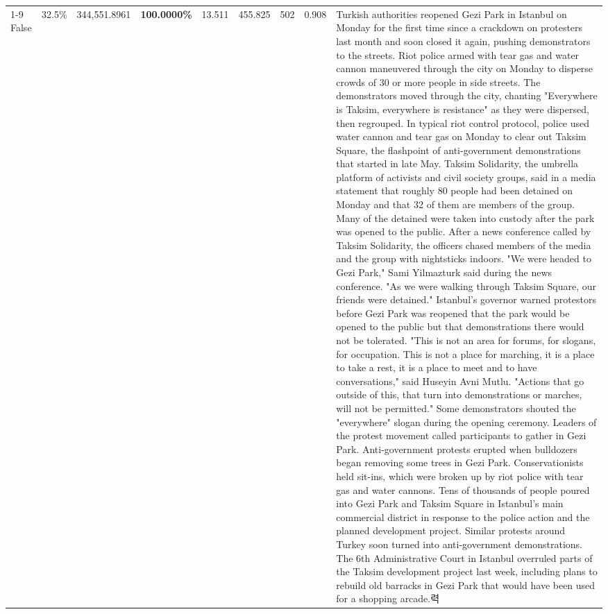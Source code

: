 \begin{table}[H]
\begin{tabular}{lllrlllll}
\cline{1-9}
False & 32.5\% & 344,551.8961 & \bfseries \color{red} 100.0000\% & 13.511 & 455.825 & 502 & 0.908 & Turkish authorities reopened Gezi Park in Istanbul on Monday for the first time since a crackdown on protesters last month and soon closed it again, pushing demonstrators to the streets. Riot police armed with tear gas and water cannon maneuvered through the city on Monday to disperse crowds of 30 or more people in side streets. The demonstrators moved through the city, chanting "Everywhere is Taksim, everywhere is resistance" as they were dispersed, then regrouped. In typical riot control protocol, police used water cannon and tear gas on Monday to clear out Taksim Square, the flashpoint of anti-government demonstrations that started in late May. Taksim Solidarity, the umbrella platform of activists and civil society groups, said in a media statement that roughly 80 people had been detained on Monday and that 32 of them are members of the group. Many of the detained were taken into custody after the park was opened to the public. After a news conference called by Taksim Solidarity, the officers chased members of the media and the group with nightsticks indoors. "We were headed to Gezi Park," Sami Yilmazturk said during the news conference. "As we were walking through Taksim Square, our friends were detained." Istanbul's governor warned protestors before Gezi Park was reopened that the park would be opened to the public but that demonstrations there would not be tolerated. "This is not an area for forums, for slogans, for occupation. This is not a place for marching, it is a place to take a rest, it is a place to meet and to have conversations," said Huseyin Avni Mutlu. "Actions that go outside of this, that turn into demonstrations or marches, will not be permitted." Some demonstrators shouted the "everywhere" slogan during the opening ceremony. Leaders of the protest movement called participants to gather in Gezi Park. Anti-government protests erupted when bulldozers began removing some trees in Gezi Park. Conservationists held sit-ins, which were broken up by riot police with tear gas and water cannons. Tens of thousands of people poured into Gezi Park and Taksim Square in Istanbul's main commercial district in response to the police action and the planned development project. Similar protests around Turkey soon turned into anti-government demonstrations. The 6th Administrative Court in Istanbul overruled parts of the Taksim development project last week, including plans to rebuild old barracks in Gezi Park that would have been used for a shopping arcade.력 \\

\end{tabular}
\end{table}
